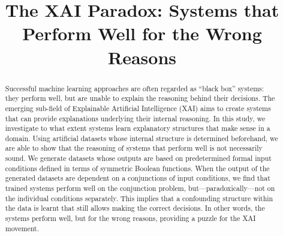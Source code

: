 \documentclass[letterpaper]{article} %
\begin{document}
%
\title{The XAI Paradox: Systems that Perform Well for the Wrong Reasons}
\maketitle
\begin{abstract}
Successful machine learning approaches are often regarded as ``black box'' systems: they perform well, but are unable to explain the reasoning behind their decisions. The emerging sub-field of Explainable Artificial Intelligence (XAI) aims to create systems that can provide explanations underlying their internal reasoning. In this study, we investigate to what extent systems learn explanatory structures that make sense in a domain. Using artificial datasets whose internal structure is determined beforehand, we are able to show that the reasoning of systems that perform well is not necessarily sound. We generate datasets whose outputs are based on predetermined formal input conditions defined in terms of symmetric Boolean functions. When the output of the generated datasets are dependent on a conjunctions of input conditions, we find that trained systems perform well on the conjunction problem, but---paradoxically---not on the individual conditions separately. This implies that a confounding
structure within the data is learnt that still allows making the correct decisions. In other words, the systems perform well, but for the wrong reasons, providing a puzzle for the XAI movement.

\end{abstract}
\end{document}
